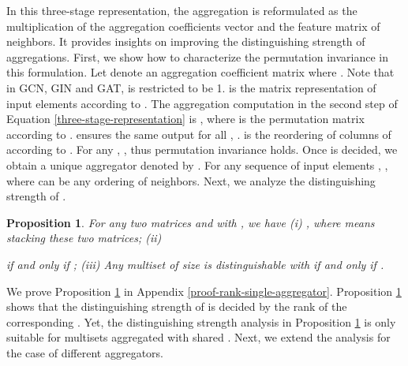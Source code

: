 \documentclass{article} \usepackage{iclr2021_conference,times}
\newtheorem{proposition}{Proposition}
\begin{document}
In this three-stage representation,
the aggregation is reformulated as the multiplication of the aggregation coefficients vector and the feature matrix of neighbors.
It provides insights on improving the distinguishing strength of aggregations.
First, we show how to characterize the permutation invariance in this formulation.
Let  denote an aggregation coefficient matrix where .
Note that in GCN, GIN and GAT,
 is restricted to be 1.
 is the matrix representation of  input elements according to .
The aggregation computation in the second step of Equation \ref{three-stage-representation} is
,
where  is the permutation matrix according to .
 ensures the same output for all , .
 is the reordering of columns of  according to .
For any ,
,
thus permutation invariance holds.
Once  is decided,
we obtain a unique aggregator denoted by .
For any sequence of input elements ,
,
where  can be any ordering of neighbors.
Next, we analyze the distinguishing strength of .
\begin{proposition}
For any two matrices  and  with ,
we have
(i)
,
where  means stacking these two matrices;
(ii)

if and only if
;
(iii)
Any multiset of size  is distinguishable with  if and only if .
\label{rank-single-aggregator}
\end{proposition}
We prove Proposition \ref{rank-single-aggregator} in Appendix \ref{proof-rank-single-aggregator}.
Proposition \ref{rank-single-aggregator} shows that the distinguishing strength of  is decided by the rank of the corresponding .
Yet, the distinguishing strength analysis in Proposition \ref{rank-single-aggregator} is only suitable for multisets aggregated with shared .
Next, we extend the analysis for the case of different aggregators.
\end{document}
